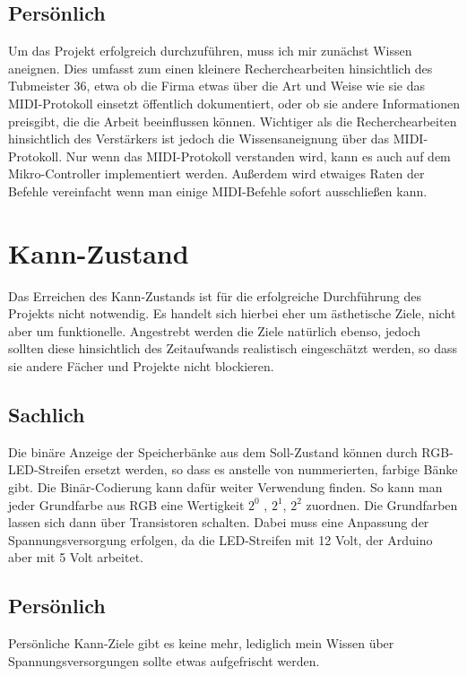 \documentclass[10pt,a4paper]{report}
\begin{document}
	\subsection{Persönlich}
	\begin{flushleft}
	Um das Projekt erfolgreich durchzuführen, muss ich mir zunächst Wissen aneignen. Dies umfasst zum einen kleinere Recherchearbeiten hinsichtlich des Tubmeister 36, etwa ob die Firma etwas über die Art und Weise wie sie das MIDI-Protokoll einsetzt öffentlich dokumentiert, oder ob sie andere Informationen preisgibt, die die Arbeit beeinflussen können. Wichtiger als die Recherchearbeiten hinsichtlich des Verstärkers ist jedoch die Wissensaneignung über das MIDI-Protokoll. Nur wenn das MIDI-Protokoll verstanden wird, kann es auch auf dem Mikro-Controller implementiert werden. Außerdem wird etwaiges Raten der Befehle vereinfacht wenn man einige MIDI-Befehle sofort ausschließen kann.
	\end{flushleft}
\section{Kann-Zustand}

Das Erreichen des Kann-Zustands ist für die erfolgreiche Durchführung des Projekts nicht notwendig. Es handelt sich hierbei eher um ästhetische Ziele, nicht aber um funktionelle. Angestrebt werden die Ziele natürlich ebenso, jedoch sollten diese hinsichtlich des Zeitaufwands realistisch eingeschätzt werden, so dass sie andere Fächer und Projekte nicht blockieren.
	\subsection{Sachlich}

	Die binäre Anzeige der Speicherbänke aus dem Soll-Zustand können durch RGB-LED-Streifen ersetzt werden, so dass es anstelle von nummerierten, farbige Bänke gibt. Die Binär-Codierung kann dafür weiter Verwendung finden. So kann man jeder Grundfarbe aus RGB eine Wertigkeit $2^{0}$ , $2^{1}$, $2^{2}$ zuordnen. Die Grundfarben lassen sich dann über Transistoren schalten. Dabei muss eine Anpassung der Spannungsversorgung erfolgen, da die LED-Streifen mit 12 Volt, der Arduino aber mit 5 Volt arbeitet.
	
	\subsection{Persönlich}

Persönliche Kann-Ziele gibt es keine mehr, lediglich mein Wissen über Spannungsversorgungen sollte etwas aufgefrischt werden.
\end{document}

